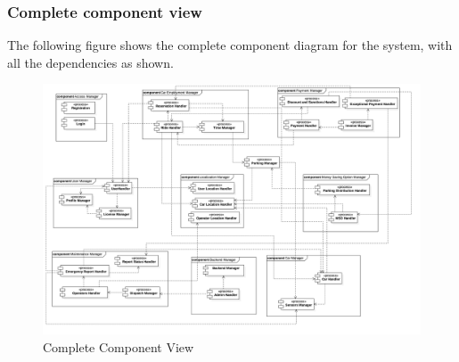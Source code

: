 	\subsubsection{Complete component view}
	
	The following figure shows the complete component diagram for the system, with all the dependencies as shown. 
	
		\begin{figure}
			\includegraphics[width=\hsize, center]{img/component_diagrams/10_complete_component_view.png}
			\caption{Complete Component View}
		\end{figure}
			
\FloatBarrier
